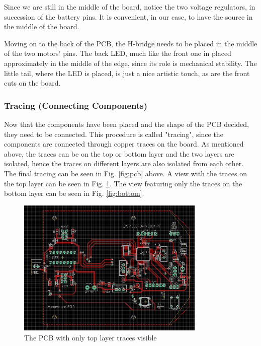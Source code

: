 Since we are still in the middle of the board, notice the two voltage regulators, in succession of the battery pins. It is convenient, in our case, to have the source in the middle of the board.

Moving on to the back of the PCB, the H-bridge needs to be placed in the middle of the two motors' pins. The back LED, much like the front one in placed approximately in the middle of the edge, since its role is mechanical stability. The little tail, where the LED is placed, is just a nice artistic touch, as are the front cuts on the board.


\subsubsection{Tracing (Connecting Components)}

Now that the components have been placed and the shape of the PCB decided, they need to be connected. This procedure is called "tracing", since the components are connected through copper traces on the board.
As mentioned above, the traces can be on the top or bottom layer and the two layers are isolated, hence the traces on different layers are also isolated from each other. 
The final tracing can be seen in Fig. \ref{fig:pcb} above.
A view with the traces on the top layer can be seen in Fig. \ref{fig:top}. The view featuring only the traces on the bottom layer can be seen in Fig. \ref{fig:bottom}.

\begin{figure}[htb]
    \centering
    \includegraphics[width=0.8\textwidth]{figures/hardware/PCB_Top.PNG}
    \caption{The PCB with only top layer traces visible}
    \label{fig:top}
\end{figure}


